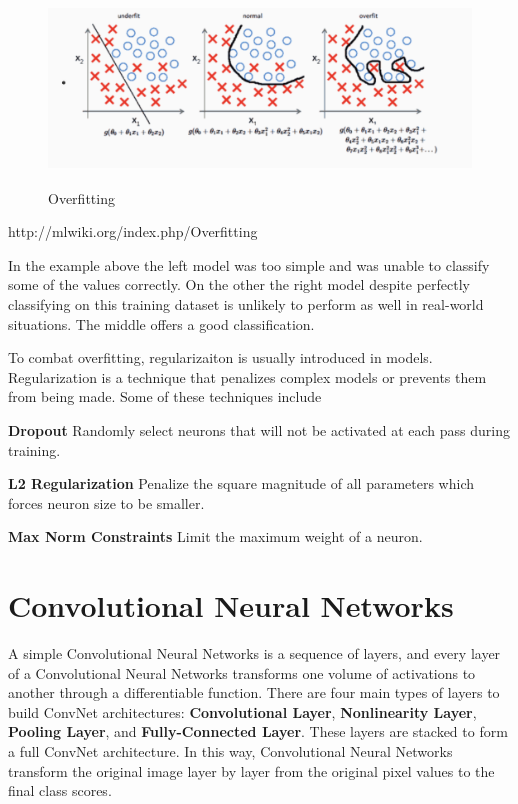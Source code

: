 \documentclass[twoside]{article}
\begin{document}
\begin{figure}[!htb]
\centering
\includegraphics[height = 2in]{pics/overfitting.png}
\caption{Overfitting\cite{}}
\label{fig:Overfitting}
\end{figure}
http://mlwiki.org/index.php/Overfitting

In the example above the left model was too simple and was unable to classify some of the values correctly. On the other the right model despite perfectly classifying on this training dataset is unlikely to perform as well in real-world situations. The middle offers a good classification. 

To combat overfitting, regularizaiton is usually introduced in models. Regularization is a technique that penalizes complex models or prevents them from being made. Some of these techniques include

\textbf{Dropout}
Randomly select neurons that will not be activated at each pass during training. 

\textbf{L2 Regularization}
Penalize the square magnitude of all parameters which forces neuron size to be smaller. 

\textbf{Max Norm Constraints}
Limit the maximum weight of a neuron. 


\section{Convolutional Neural Networks}
A simple Convolutional Neural Networks is a sequence of layers, and every layer of a Convolutional Neural Networks transforms one volume of activations to another through a differentiable function. There are four main types of layers to build ConvNet architectures: \textbf{Convolutional Layer}, \textbf{Nonlinearity Layer}, \textbf{Pooling Layer}, and \textbf{Fully-Connected Layer}. These layers are stacked to form a full ConvNet architecture. In this way, Convolutional Neural Networks transform the original image layer by layer from the original pixel values to the final class scores. 
\end{document}
